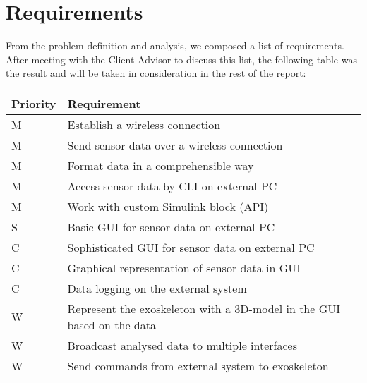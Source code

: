 \section{Requirements}
From the problem definition and analysis, we composed a list of requirements.
After meeting with the Client Advisor to discuss this list, the following table was the result and will be taken in consideration in the rest of the report:\\

{\renewcommand{\arraystretch}{1.5}
	\centering
	\begin{tabular}{ | l | l | }
		\hline
		\bfseries{Priority} & \bfseries{Requirement} \\ \hline
		M & Establish a wireless connection \\ \hline
		M & Send sensor data over a wireless connection \\ \hline
		M & Format data in a comprehensible way \\ \hline
		M & Access sensor data by CLI on external PC \\ \hline
		M & Work with custom Simulink block (API) \\ \hline
		S & Basic GUI for sensor data on external PC \\ \hline
		C & Sophisticated GUI for sensor data on external PC\\ \hline
		C & Graphical representation of sensor data in GUI\\ \hline
		C & Data logging on the external system \\ \hline
		W & Represent the exoskeleton with a 3D-model in the GUI based on the data \\ \hline
		W & Broadcast analysed data to multiple interfaces \\ \hline 
		W & Send commands from external system to exoskeleton \\ \hline 
	\end{tabular}
	\label{table:requi}
}
